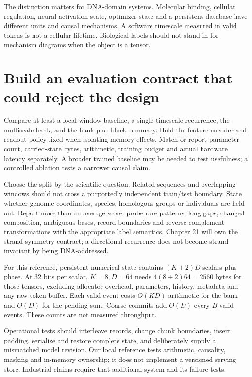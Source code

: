The distinction matters for DNA-domain systems. Molecular binding, cellular
regulation, neural activation state, optimizer state and a persistent
database have different units and causal mechanisms. A software timescale
measured in valid tokens is not a cellular lifetime. Biological labels
should not stand in for mechanism diagrams when the object is a tensor.

\section{Build an evaluation contract that could reject the design}

Compare at least a local-window baseline, a single-timescale recurrence,
the multiscale bank, and the bank plus block summary. Hold the feature
encoder and readout policy fixed when isolating memory effects. Match or
report parameter count, carried-state bytes, arithmetic, training budget
and actual hardware latency separately. A broader trained baseline may be
needed to test usefulness; a controlled ablation tests a narrower causal claim.

Choose the split by the scientific question. Related sequences and overlapping
windows should not cross a purportedly independent train/test boundary.
State whether genomic coordinates, species, homologous groups or individuals
are held out. Report more than an average score: probe rare patterns,
long gaps, changed composition, ambiguous bases, record boundaries and
reverse-complement transformations with the appropriate label semantics.
Chapter 21 will own the strand-symmetry contract; a directional recurrence
does not become strand invariant by being DNA-addressed.

For this reference, persistent numerical state contains $(K+2)D$ scalars
plus phase. At 32 bits per scalar, $K=8,D=64$ needs
$4(8+2)64=2560$ bytes for those tensors, excluding allocator overhead,
parameters, history, metadata and any raw-token buffer.
Each valid event costs $O(KD)$ arithmetic for the bank and $O(D)$ for the
pending sum. Coarse commits add $O(D)$ every $B$ valid events.
These counts are not measured throughput.

Operational tests should interleave records, change chunk boundaries, insert
padding, serialize and restore complete state, and deliberately supply a
mismatched model revision. Our local reference tests arithmetic, causality,
masking and in-memory ownership; it does not implement a versioned serving
store. Industrial claims require that additional system and its failure tests.


